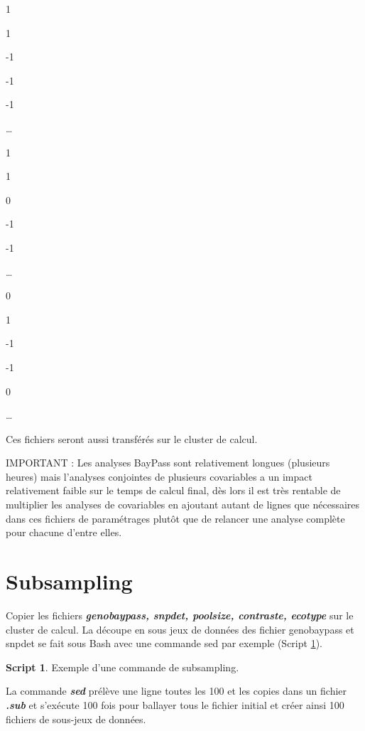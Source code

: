 \documentclass[
  openany]{book}
\newenvironment{Shaded}{\begin{snugshade}}{\end{snugshade}}
\newcommand{\AttributeTok}[1]{\textcolor[rgb]{0.13,0.29,0.53}{#1}}
\newcommand{\ControlFlowTok}[1]{\textcolor[rgb]{0.13,0.29,0.53}{\textbf{#1}}}
\newcommand{\DataTypeTok}[1]{\textcolor[rgb]{0.13,0.29,0.53}{#1}}
\newcommand{\DecValTok}[1]{\textcolor[rgb]{0.00,0.00,0.81}{#1}}
\newcommand{\FunctionTok}[1]{\textcolor[rgb]{0.13,0.29,0.53}{\textbf{#1}}}
\newcommand{\KeywordTok}[1]{\textcolor[rgb]{0.13,0.29,0.53}{\textbf{#1}}}
\newcommand{\NormalTok}[1]{#1}
\newcommand{\OperatorTok}[1]{\textcolor[rgb]{0.81,0.36,0.00}{\textbf{#1}}}
\newcommand{\StringTok}[1]{\textcolor[rgb]{0.31,0.60,0.02}{#1}}
\newcommand{\VariableTok}[1]{\textcolor[rgb]{0.00,0.00,0.00}{#1}}
\theoremstyle{definition}
\theoremstyle{definition}
\newtheorem{example}{Script}[chapter]
\theoremstyle{definition}
\theoremstyle{definition}
\theoremstyle{remark}
\begin{document}
1

1

-1

-1

-1

\ldots{}

1

1

0

-1

-1

\ldots{}

0

1

-1

-1

0

\ldots{}

Ces fichiers seront aussi transférés sur le cluster de calcul.

IMPORTANT : Les analyses BayPass sont relativement longues (plusieurs heures) mais l'analyses conjointes de plusieurs covariables a un impact relativement faible sur le temps de calcul final, dès lors il est très rentable de multiplier les analyses de covariables en ajoutant autant de lignes que nécessaires dans ces fichiers de paramétrages plutôt que de relancer une analyse complète pour chacune d'entre elles.

\hypertarget{subsampling}{%
\section*{Subsampling}\label{subsampling}}

Copier les fichiers \textbf{\emph{genobaypass, snpdet, poolsize, contraste, ecotype}} sur le cluster de calcul.
La découpe en sous jeux de données des fichier genobaypass et snpdet se fait sous Bash avec une commande sed par exemple (Script \ref{exm:script3}).

\begin{example}
\protect\hypertarget{exm:script3}{}\label{exm:script3}{Exemple d'une commande de subsampling.}
\end{example}

La commande \textbf{\emph{sed}} prélève une ligne toutes les 100 et les copies dans un fichier \textbf{\emph{.sub}} et s'exécute 100 fois pour ballayer tous le fichier initial et créer ainsi 100 fichiers de sous-jeux de données.

\begin{Shaded}
\end{Shaded}
\end{document}
